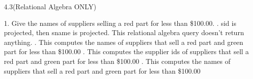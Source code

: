 \begin{problem}{4.3(Relational Algebra ONLY)}
\end{problem}

\begin{problem}{4.4}
  \begin{solution}
    1. Give the names of suppliers selling a red part for less than \$100.00.
    . sid is projected, then sname is projected. This relational algebra query doesn't return anything.
    . This computes the names of suppliers that sell a red part and green part for less than \$100.00
    . This computes the supplier ids of suppliers that sell a red part and green part for less than \$100.00
    . This computes the names of suppliers that sell a red part and green part for less than \$100.00
  \end{solution}
\end{problem}

\begin{problem}{5.2}
\end{problem}

\begin{problem}{5.4}
\end{problem}


